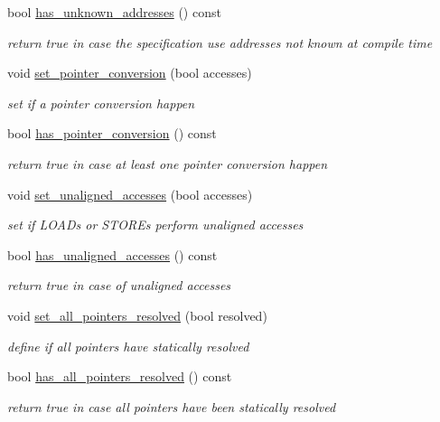 \begin{DoxyCompactItemize}
bool \hyperlink{classmemory_a90adcbcfd3399dad6ff8ef90c6ad9a35}{has\+\_\+unknown\+\_\+addresses} () const
\begin{DoxyCompactList}\small\item\em return true in case the specification use addresses not known at compile time \end{DoxyCompactList}\item 
void \hyperlink{classmemory_ac3c4105219a8035042d60ba076502ea4}{set\+\_\+pointer\+\_\+conversion} (bool accesses)
\begin{DoxyCompactList}\small\item\em set if a pointer conversion happen \end{DoxyCompactList}\item 
bool \hyperlink{classmemory_a433d1c32eaf44fd28694cb612a1330f0}{has\+\_\+pointer\+\_\+conversion} () const
\begin{DoxyCompactList}\small\item\em return true in case at least one pointer conversion happen \end{DoxyCompactList}\item 
void \hyperlink{classmemory_a7900eedc2a6002a1519927f648064dd8}{set\+\_\+unaligned\+\_\+accesses} (bool accesses)
\begin{DoxyCompactList}\small\item\em set if L\+O\+A\+Ds or S\+T\+O\+R\+Es perform unaligned accesses \end{DoxyCompactList}\item 
bool \hyperlink{classmemory_a4cfc9a502338a2d4ba7c831c63e41edf}{has\+\_\+unaligned\+\_\+accesses} () const
\begin{DoxyCompactList}\small\item\em return true in case of unaligned accesses \end{DoxyCompactList}\item 
void \hyperlink{classmemory_ab351898868e78407d9fc2ec1e4969c0c}{set\+\_\+all\+\_\+pointers\+\_\+resolved} (bool resolved)
\begin{DoxyCompactList}\small\item\em define if all pointers have statically resolved \end{DoxyCompactList}\item 
bool \hyperlink{classmemory_abf339e7c5e5b888f1dfd5927f8750497}{has\+\_\+all\+\_\+pointers\+\_\+resolved} () const
\begin{DoxyCompactList}\small\item\em return true in case all pointers have been statically resolved \end{DoxyCompactList}\item 

\end{DoxyCompactItemize}
